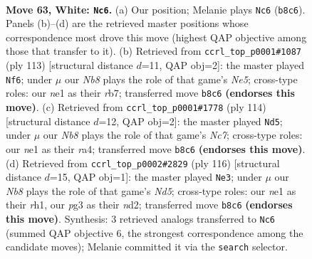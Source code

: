 \documentclass[11pt]{article}
\begin{document}
\clearpage

\begin{figure}[p]\centering
\begin{subfigure}{0.46\textwidth}\centering
\resizebox{\linewidth}{!}{%
\newchessgame
\chessboard[
  setfen={1N6/8/3p2k1/8/7p/6p1/1R6/4n2K w - - 0 63},
  showmover=false,
  pgfstyle=straightmove, color=movearrow, markmove={b8-c6}
]}
\caption{}
\end{subfigure}\hfill
\begin{subfigure}{0.46\textwidth}\centering
\resizebox{\linewidth}{!}{%
\newchessgame
\chessboard[
  setfen={7k/1R6/8/7P/r3n1P1/8/6K1/8 b - - 4 57},
  showmover=false,
  pgfstyle=straightmove, color=movearrow, markmove={e4-f6}
]}
\caption{}
\end{subfigure}
\\[4pt]
\begin{subfigure}{0.46\textwidth}\centering
\resizebox{\linewidth}{!}{%
\newchessgame
\chessboard[
  setfen={8/p1N3R1/8/5K1p/r7/7k/8/8 w - - 12 58},
  showmover=false,
  pgfstyle=straightmove, color=movearrow, markmove={c7-d5}
]}
\caption{}
\end{subfigure}\hfill
\begin{subfigure}{0.46\textwidth}\centering
\resizebox{\linewidth}{!}{%
\newchessgame
\chessboard[
  setfen={8/6k1/8/R2Np3/8/8/3n1K2/7r w - - 8 59},
  showmover=false,
  pgfstyle=straightmove, color=movearrow, markmove={d5-e3}
]}
\caption{}
\end{subfigure}
\caption{\textbf{Move 63, White: \texttt{Nc6}.} (a) Our position; Melanie plays \texttt{Nc6} (\texttt{b8c6}). Panels (b)--(d) are the retrieved master positions whose correspondence most drove this move (highest QAP objective among those that transfer to it). (b) Retrieved from \texttt{ccrl\_top\_p0001\#1087} (ply 113) [structural distance $d$=11, QAP obj=2]: the master played \texttt{Nf6}; under $\mu$ our \emph{Nb8} plays the role of that game's \emph{Ne5}; cross-type roles: our \emph{n}e1 as their \emph{r}b7; transferred move \texttt{b8c6} \textbf{(endorses this move)}. (c) Retrieved from \texttt{ccrl\_top\_p0001\#1778} (ply 114) [structural distance $d$=12, QAP obj=2]: the master played \texttt{Nd5}; under $\mu$ our \emph{Nb8} plays the role of that game's \emph{Nc7}; cross-type roles: our \emph{n}e1 as their \emph{r}a4; transferred move \texttt{b8c6} \textbf{(endorses this move)}. (d) Retrieved from \texttt{ccrl\_top\_p0002\#2829} (ply 116) [structural distance $d$=15, QAP obj=1]: the master played \texttt{Ne3}; under $\mu$ our \emph{Nb8} plays the role of that game's \emph{Nd5}; cross-type roles: our \emph{n}e1 as their \emph{r}h1, our \emph{p}g3 as their \emph{n}d2; transferred move \texttt{b8c6} \textbf{(endorses this move)}. Synthesis: 3 retrieved analogs transferred to \texttt{Nc6} (summed QAP objective 6, the strongest correspondence among the candidate moves); Melanie committed it via the \texttt{search} selector.}
\label{fig:thought-m124}
\end{figure}
\end{document}
